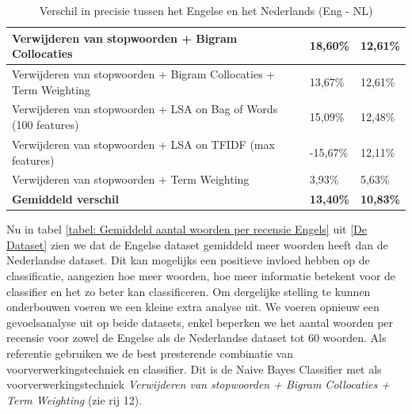 \begin{table}[h]
\begin{adjustbox}{width=1\textwidth}
\begin{tabular}{|l|l|l|}
Verwijderen van stopwoorden + Bigram Collocaties                                     & 18,60\%                                           & 12,61\%                                  \\ \hline
Verwijderen van stopwoorden + Bigram Collocaties + Term Weighting                    & 13,67\%                                           & 12,61\%                                  \\ \hline
Verwijderen van stopwoorden + LSA on Bag of Words (100 features)                     & 15,09\%                                           & 12,48\%                                  \\ \hline
Verwijderen van stopwoorden + LSA on TFIDF (max features)                            & -15,67\%                                          & 12,11\%                                  \\ \hline
Verwijderen van stopwoorden + Term Weighting                                         & 3,93\%                                            & 5,63\%                                   \\ \hline
{\bf Gemiddeld verschil}                                                             & {\bf 13,40\%}                                     & {\bf 10,83\%}                            \\ \hline
\end{tabular}
\end{adjustbox}
\label{tabel: verschil engels en nederlandse prestatie}
\caption{Verschil in precisie tussen het Engelse en het Nederlands (Eng - NL)}
\end{table}

Nu in tabel \ref{tabel: Gemiddeld aantal woorden per recensie Engels} uit \ref{De Dataset} zien we dat de Engelse dataset gemiddeld meer woorden heeft dan de Nederlandse dataset. Dit kan mogelijks een positieve invloed hebben op de classificatie, aangezien hoe meer woorden, hoe meer informatie betekent voor de classifier en het zo beter kan classificeren. Om dergelijke stelling te kunnen onderbouwen voeren we een kleine extra analyse uit. We voeren opnieuw een gevoelsanalyse uit op beide datasets, enkel beperken we het aantal woorden per recensie voor zowel de Engelse als de Nederlandse dataset tot 60 woorden. Als referentie gebruiken we de best presterende combinatie van voorverwerkingstechniek en classifier. Dit is de Naive Bayes Classifier met als voorverwerkingstechniek \textit{Verwijderen van stopwoorden + Bigram Collocaties + Term Weighting} (zie rij 12).

